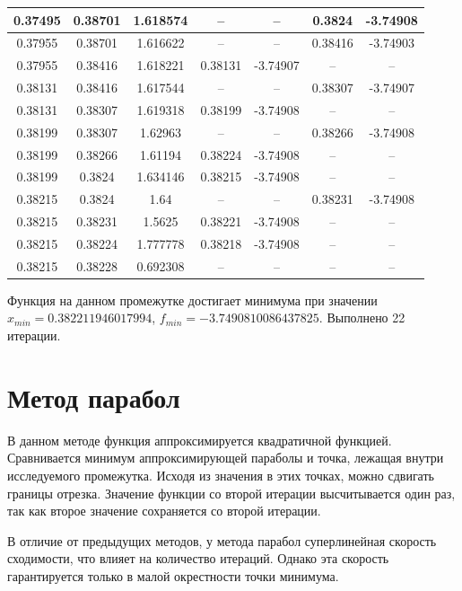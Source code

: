 \documentclass[12pt]{article}
\begin{document}
\begin{table}[h]
\begin{tabular}{|c|c|c|c|c|c|c|}
0.37495 & 0.38701 & 1.618574 & --      & --       & 0.3824  & -3.74908 \\ \hline
0.37955 & 0.38701 & 1.616622 & --      & --       & 0.38416 & -3.74903 \\ \hline
0.37955 & 0.38416 & 1.618221 & 0.38131 & -3.74907 & --      & --       \\ \hline
0.38131 & 0.38416 & 1.617544 & --      & --       & 0.38307 & -3.74907 \\ \hline
0.38131 & 0.38307 & 1.619318 & 0.38199 & -3.74908 & --      & --       \\ \hline
0.38199 & 0.38307 & 1.62963  & --      & --       & 0.38266 & -3.74908 \\ \hline
0.38199 & 0.38266 & 1.61194  & 0.38224 & -3.74908 & --      & --       \\ \hline
0.38199 & 0.3824  & 1.634146 & 0.38215 & -3.74908 & --      & --       \\ \hline
0.38215 & 0.3824  & 1.64     & --      & --       & 0.38231 & -3.74908 \\ \hline
0.38215 & 0.38231 & 1.5625   & 0.38221 & -3.74908 & --      & --       \\ \hline
0.38215 & 0.38224 & 1.777778 & 0.38218 & -3.74908 & --      & --       \\ \hline
0.38215 & 0.38228 & 0.692308 & --      & --       & --      & --       \\ \hline
\end{tabular}
\end{table}

Функция на данном промежутке достигает минимума при значении $x_{min} = 0.382211946017994$, $f_{min} = -3.7490810086437825$. Выполнено 22 итерации.

\newpage
\section{Метод парабол}

В данном методе функция аппроксимируется квадратичной функцией. Сравнивается минимум аппроксимирующей параболы и точка, лежащая внутри исследуемого промежутка. Исходя из значения в этих точках, можно сдвигать границы отрезка. Значение функции со второй итерации высчитывается один раз, так как второе значение сохраняется со второй итерации.

В отличие от предыдущих методов, у метода парабол суперлинейная скорость сходимости, что влияет на количество итераций. Однако эта скорость гарантируется только в малой окрестности точки минимума.
\end{document}
